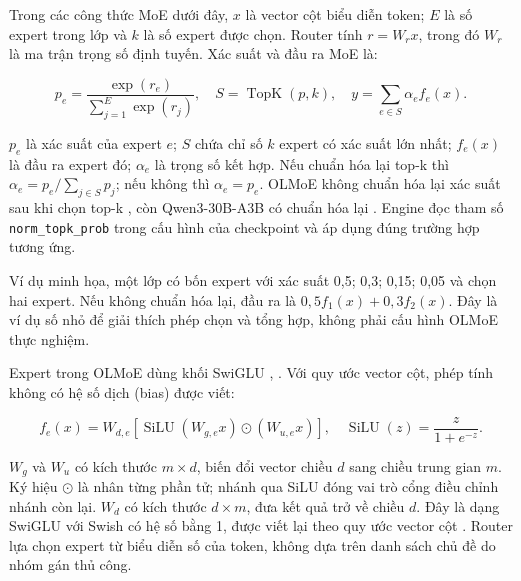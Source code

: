 Trong các công thức MoE dưới đây, $x$ là vector cột biểu diễn token; $E$ là số expert trong lớp và $k$ là số expert được chọn. Router tính $r=W_rx$, trong đó $W_r$ là ma trận trọng số định tuyến. Xác suất và đầu ra MoE là:

\begin{equation}
\label{eq:2.5}
p_e=\frac{\exp(r_e)}{\sum_{j=1}^{E}\exp(r_j)},\quad S=\operatorname{TopK}(p,k),\quad y=\sum_{e\in S}\alpha_e f_e(x).
\end{equation}

$p_e$ là xác suất của expert $e$; $S$ chứa chỉ số $k$ expert có xác suất lớn nhất; $f_e(x)$ là đầu ra expert đó; $\alpha_e$ là trọng số kết hợp. Nếu chuẩn hóa lại top-k thì $\alpha_e=p_e/\sum_{j\in S}p_j$; nếu không thì $\alpha_e=p_e$. OLMoE không chuẩn hóa lại xác suất sau khi chọn top-k \cite{olmoe_0924_config}, còn Qwen3-30B-A3B có chuẩn hóa lại \cite{qwen3_config}. Engine đọc tham số \texttt{norm\_topk\_prob} trong cấu hình của checkpoint và áp dụng đúng trường hợp tương ứng.

Ví dụ minh họa, một lớp có bốn expert với xác suất 0,5; 0,3; 0,15; 0,05 và chọn hai expert. Nếu không chuẩn hóa lại, đầu ra là $0,5f_1(x)+0,3f_2(x)$. Đây là ví dụ số nhỏ để giải thích phép chọn và tổng hợp, không phải cấu hình OLMoE thực nghiệm.

Expert trong OLMoE dùng khối SwiGLU \cite{olmoe}, \cite{swiglu}. Với quy ước vector cột, phép tính không có hệ số dịch (bias) được viết:

\begin{equation}
\label{eq:2.6}
f_e(x)=W_{d,e}\left[\operatorname{SiLU}(W_{g,e}x)\odot(W_{u,e}x)\right],\quad \operatorname{SiLU}(z)=\frac{z}{1+e^{-z}}.
\end{equation}

$W_g$ và $W_u$ có kích thước $m\times d$, biến đổi vector chiều $d$ sang chiều trung gian $m$. Ký hiệu $\odot$ là nhân từng phần tử; nhánh qua SiLU đóng vai trò cổng điều chỉnh nhánh còn lại. $W_d$ có kích thước $d\times m$, đưa kết quả trở về chiều $d$. Đây là dạng SwiGLU với Swish có hệ số bằng 1, được viết lại theo quy ước vector cột \cite[mục 2]{swiglu}. Router lựa chọn expert từ biểu diễn số của token, không dựa trên danh sách chủ đề do nhóm gán thủ công.


